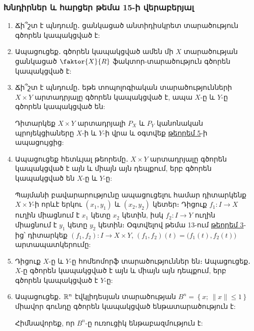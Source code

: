 \bigskip
\bigskip
\subsubsection*{Խնդիրներ և հարցեր թեմա 15-ի վերաբերյալ}

\begin{enumerate}[label=\thesection.\arabic*.]


\item Ճի՞շտ է պնդումը․ ցանկացած անտիդիսկրետ տարածություն գծորեն կապա\-կց\-ված է:

\item Ապացուցեք․ գծորեն կապակցված ամեն մի $X$ տարածության ցանկացած $\faktor{X}{R}$ ֆակտոր-տարածություն գծորեն կապակցված է:

\item Ճի՞շտ է պնդումը․ եթե տոպոլոգիական տարածությունների $X \times Y$ արտադրյալը գծորեն կապակցված է, ապա $X$-ը և $Y$-ը գծորեն կապակցված են:
\begin{hint}
Դիտարկեք $X \times Y$ արտադրյալի $P_X$ և $P_Y$ կանոնական պրո\-յեկ\-ցի\-ա\-ները $X$-ի և $Y$-ի վրա և օգտվեք \hyperref[ch15thm5]{թեորեմ 5}-ի ապացույցից:
\end{hint}

\item Ապացուցեք հետևյալ թեորեմը․ $X \times Y$ արտադրյալը գծորեն կապակցված է այն և միայն այն դեպքում, երբ գծորեն կապակցված են $X$-ը և $Y$-ը:
\begin{hint}
Պայմանի բավարարությունը ապացուցելու համար դիտարկենք $X \times Y$-ի որևէ երկու $(x_1, y_1)$ և $(x_2, y_2)$ կետեր։ Դիցուք $f_1: I \to X$ ուղին մի\-աց\-նում է $x_1$ կետը $x_2$ կետին, իսկ $f_2: I \to Y$ ուղին միացնում է $y_1$ կետը $y_2$ կետին։ Օգտվելով թեմա 13-ում \hyperref[ch13thm3]{թեորեմ 3}-ից՝ դիտարկեք $(f_1, f_2): I \to X \times Y$, $(f_1, f_2)(t) = \big(f_1(t), f_2(t)\big)$ արտապատկերումը:
\end{hint}

\item Դիցուք $X$-ը և $Y$-ը հոմեոմորֆ տարածություններ են։ Ապացուցեք․ $X$-ը գծո\-րեն կապակցված է այն և միայն այն դեպքում, երբ գծորեն կապակցված է $Y$-ը:

\item Ապացուցեք․ $\mathbb{R}^n$ էվկլիդեսյան տարածության $B^n = \left\{x;\ \|x\| \le 1\right\}$ միավոր գուն\-դը գծորեն կապակցված ենթատարածություն է:
\begin{hint}
Հիմնավորեք, որ $B^n$-ը ուռուցիկ ենթաբազմություն է:
\end{hint}


\end{enumerate}
